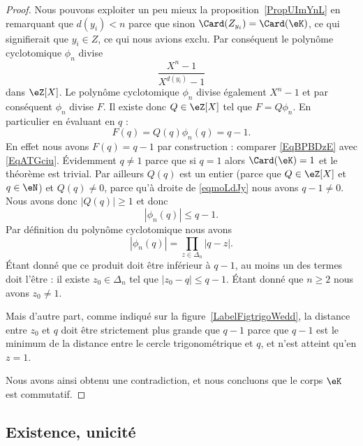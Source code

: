 \begin{proof}
	Nous pouvons exploiter un peu mieux la proposition~\ref{PropUImYnL} en remarquant que \( d(y_i)<n\) parce que sinon \( \Card(Z_{y_i})=\Card(\eK)\), ce qui signifierait que \( y_i\in Z\), ce qui nous avions exclu. Par conséquent le polynôme cyclotomique \( \phi_n\) divise
	\begin{equation}
		\frac{ X^n-1 }{ X^{d(y_i)}-1 }
	\end{equation}
	dans \( \eZ[X]\). Le polynôme cyclotomique \( \phi_n\) divise également \( X^n-1\) et par conséquent \( \phi_n\) divise \( F\). Il existe donc \( Q\in \eZ[X]\) tel que \( F=Q\phi_n\). En particulier en évaluant en \( q\) :
	\begin{equation}    \label{eqmoLdJy}
		F(q)=Q(q)\phi_n(q)=q-1.
	\end{equation}
	En effet nous avons \( F(q)=q-1\) par construction : comparer \eqref{EqBPBDzE} avec \eqref{EqATGciu}. Évidemment \( q\neq 1\) parce que si \( q=1\) alors \( \Card(\eK)=1\) et le théorème est trivial. Par ailleurs \( Q(q)\) est un entier (parce que \( Q\in \eZ[X]\) et \( q\in \eN\)) et \( Q(q)\neq 0\), parce qu'à droite de \eqref{eqmoLdJy} nous avons \( q-1\neq 0\). Nous avons donc \( | Q(q) |\geq 1\) et donc
	\begin{equation}
		| \phi_n(q) |\leq q-1.
	\end{equation}
	Par définition du polynôme cyclotomique nous avons
	\begin{equation}
		| \phi_n(q) |=\prod_{z\in\Delta_n}| q-z |.
	\end{equation}
	Étant donné que ce produit doit être inférieur à \( q-1\), au moins un des termes doit l'être : il existe \( z_0\in \Delta_n\) tel que \( | z_0-q |\leq q-1\). Étant donné que \( n\geq 2\) nous avons \( z_0\neq 1\).

	Mais d'autre part, comme indiqué sur la figure~\ref{LabelFigtrigoWedd}, la distance entre \( z_0\) et \( q\) doit être strictement plus grande que \( q-1\) parce que \( q-1\) est le minimum de la distance entre le cercle trigonométrique et \( q\), et n'est atteint qu'en \( z=1\).
	\newcommand{\CaptionFigtrigoWedd}{Nous devons avoir \( | z_0-q |>q-1\).}
	

	Nous avons ainsi obtenu une contradiction, et nous concluons que le corps \( \eK\) est commutatif.
\end{proof}

\subsection{Existence, unicité}

